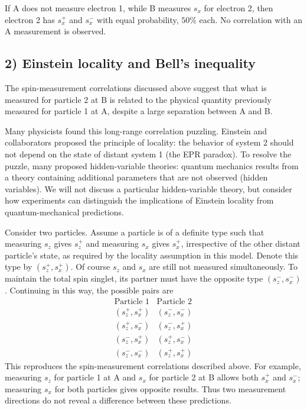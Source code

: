 If A does not measure electron 1, while B measures $s_x$ for electron 2, then electron 2 has $s_x^+$ and $s_x^-$ with equal probability, $50\%$ each. No correlation with an A measurement is observed.

\subsection*{2) Einstein locality and Bell's inequality}
The spin-measurement correlations discussed above suggest that what is measured for particle 2 at B is related to the physical quantity previously measured for particle 1 at A, despite a large separation between A and B.

Many physicists found this long-range correlation puzzling. Einstein and collaborators proposed the principle of locality: the behavior of system 2 should not depend on the state of distant system 1 (the EPR paradox). To resolve the puzzle, many proposed hidden-variable theories: quantum mechanics results from a theory containing additional parameters that are not observed (hidden variables). We will not discuss a particular hidden-variable theory, but consider how experiments can distinguish the implications of Einstein locality from quantum-mechanical predictions.

Consider two particles. Assume a particle is of a definite type such that measuring $s_z$ gives $s_z^+$ and measuring $s_x$ gives $s_x^+$, irrespective of the other distant particle's state, as required by the locality assumption in this model. Denote this type by $(s_z^+,s_x^+)$. Of course $s_z$ and $s_x$ are still not measured simultaneously. To maintain the total spin singlet, its partner must have the opposite type $(s_z^-,s_x^-)$. Continuing in this way, the possible pairs are
\begin{equation}
\begin{array}{cc}
\text{Particle 1}&\text{Particle 2}\\\hline
(s_z^+,s_x^+)&(s_z^-,s_x^-)\\
(s_z^+,s_x^-)&(s_z^-,s_x^+)\\
(s_z^-,s_x^+)&(s_z^+,s_x^-)\\
(s_z^-,s_x^-)&(s_z^+,s_x^+)
\end{array}
\end{equation}
This reproduces the spin-measurement correlations described above. For example, measuring $s_z$ for particle 1 at A and $s_x$ for particle 2 at B allows both $s_x^+$ and $s_x^-$; measuring $s_x$ for both particles gives opposite results. Thus two measurement directions do not reveal a difference between these predictions.

